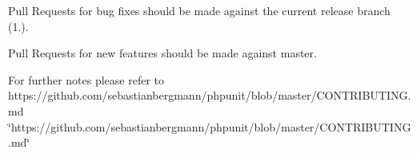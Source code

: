 Pull Requests for bug fixes should be made against the current release branch (1.).

Pull Requests for new features should be made against master.

For further notes please refer to https\+://github.com/sebastianbergmann/phpunit/blob/master/\+C\+O\+N\+T\+R\+I\+B\+U\+T\+I\+N\+G.\+md \char`\"{}https\+://github.\+com/sebastianbergmann/phpunit/blob/master/\+C\+O\+N\+T\+R\+I\+B\+U\+T\+I\+N\+G.\+md\char`\"{} 